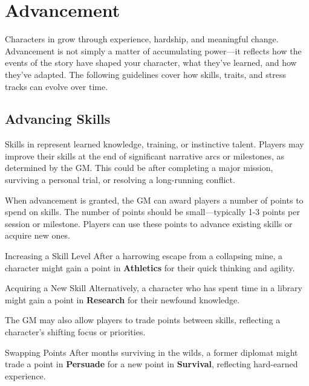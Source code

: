 \section{Advancement}

Characters in \wyrd grow through experience, hardship, and meaningful change. Advancement is not simply a matter of accumulating power—it reflects how the events of the story have shaped your character, what they’ve learned, and how they’ve adapted. The following guidelines cover how skills, traits, and stress tracks can evolve over time.

\subsection{Advancing Skills}

Skills in \wyrd represent learned knowledge, training, or instinctive talent. Players may improve their skills at the end of significant narrative arcs or milestones, as determined by the GM. This could be after completing a major mission, surviving a personal trial, or resolving a long-running conflict.

When advancement is granted, the GM can award players a number of points to spend on skills. The number of points should be small—typically 1-3 points per session or milestone. Players can use these points to advance existing skills or acquire new ones.

\begin{Example}{Increasing a Skill Level}
    After a harrowing escape from a collapsing mine, a character might gain a point in \textbf{Athletics} for their quick thinking and agility.
\end{Example}

\begin{Example}{Acquiring a New Skill}
    Alternatively, a character who has spent time in a library might gain a point in \textbf{Research} for their newfound knowledge.
\end{Example}

\noindent
The GM may also allow players to trade points between skills, reflecting a character’s shifting focus or priorities.

\begin{Example}{Swapping Points}
    After months surviving in the wilds, a former diplomat might trade a point in \textbf{Persuade} for a new point in \textbf{Survival}, reflecting hard-earned experience.
\end{Example}


